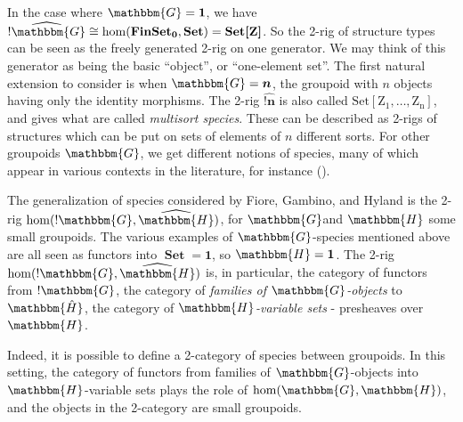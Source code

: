 \documentclass{amsart} \usepackage{amsmath,amssymb,bbm}
\newcommand{\opname}[1]{\operatorname{#1}}
\newcommand{\bldsym}[1]{\boldsymbol{#1}}
\newcommand{\catname}[1]{\boldsymbol{\opname{{#1}}}}
\newcommand{\FSN}{\catname{FinSet_0}}
\newcommand{\Set}{\catname{Set}}
\newcommand{\SetZ}{\catname{Set [ Z ]}}
\begin{document}
In the case where $\mathbbm{G} =\bldsym{1}$, we have
$\widehat{!\mathbbm{G}} \cong \hom ( \FSN, \Set ) = \SetZ$.  So the
2-rig of structure types can be seen as the freely generated 2-rig on
one generator.  We may think of this generator as being the basic
``object'', or ``one-element set''.  The first natural extension to
consider is when $\mathbbm{G} =\bldsym{n}$, the groupoid with $n$
objects having only the identity morphisms.  The 2-rig
$\widehat{!\bldsym{n}}$ is also called $\catname{Set [ Z_1, \ldots,
Z_n ]}$, and gives what are called {\textit{multisort species}}.  These
can be described as 2-rigs of structures which can be put on sets of
elements of $n$ different sorts.  For other groupoids $\mathbbm{G}$,
we get different notions of species, many of which appear in various
contexts in the literature, for instance ({\cite{BLL}}).


The generalization of species considered by Fiore, Gambino, and Hyland
{\cite{figamhy}} is the 2-rig $\hom ( ! \mathbbm{G},
\widehat{\mathbbm{H}} )$, for $\mathbbm{G}$and $\mathbbm{H}$ some
small groupoids.  The various examples of $\mathbbm{G}$-species
mentioned above are all seen as functors into $\Set =
\hat{\bldsym{1}}$, so $\mathbbm{H} =\bldsym{1}$.  The 2-rig $\hom ( ! 
\mathbbm{G}, \widehat{\mathbbm{H}} )$ is, in particular, the category
of functors from $! \mathbbm{G}$, the category of {\textit{families of
$\mathbbm{G}$-objects}} to $\mathbbm{\hat{H}}$, the category of
{\textit{$\mathbbm{H}$-variable sets}} - presheaves over $\mathbbm{H}$.

Indeed, it is possible to define a 2-category of species between
groupoids.  In this setting, the category of functors from families of
$\mathbbm{G}$-objects into $\mathbbm{H}$-variable sets plays the role
of $\hom ( \mathbbm{G}, \mathbbm{H} )$, and the objects in the
2-category are small groupoids.
\end{document}
